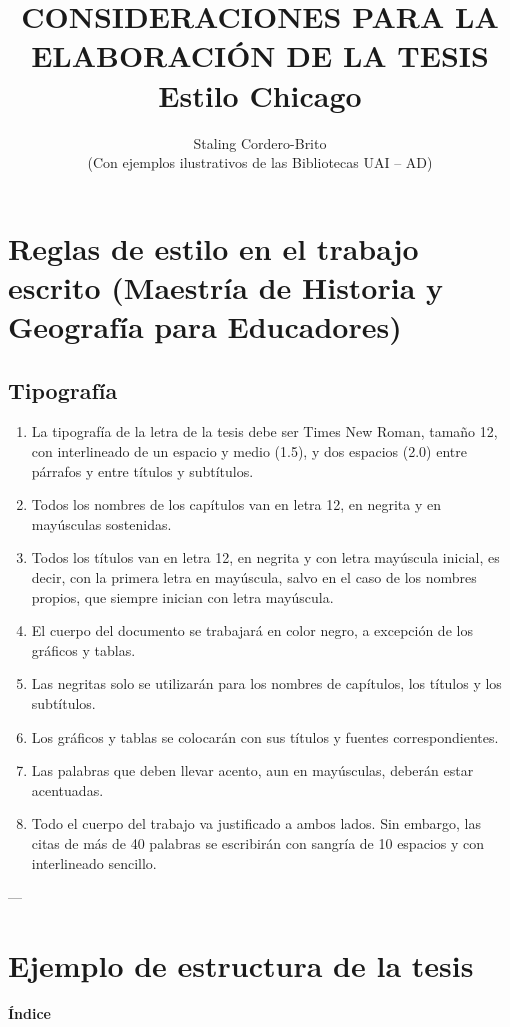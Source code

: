 \documentclass[12pt,a4paper]{article}
\title{CONSIDERACIONES PARA LA ELABORACIÓN DE LA TESIS \\ Estilo Chicago}
\author{Staling Cordero-Brito \\ (Con ejemplos ilustrativos de las Bibliotecas UAI -- AD)}
\date{}
\begin{document}
\maketitle

\section{Reglas de estilo en el trabajo escrito (Maestría de Historia y Geografía para Educadores)}

\subsection*{Tipografía}
\begin{enumerate}[label=\alph*)]
    \item La tipografía de la letra de la tesis debe ser Times New Roman, tamaño 12, con interlineado de un espacio y medio (1.5), y dos espacios (2.0) entre párrafos y entre títulos y subtítulos.
    \item Todos los nombres de los capítulos van en letra 12, en negrita y en mayúsculas sostenidas.
    \item Todos los títulos van en letra 12, en negrita y con letra mayúscula inicial, es decir, con la primera letra en mayúscula, salvo en el caso de los nombres propios, que siempre inician con letra mayúscula.
    \item El cuerpo del documento se trabajará en color negro, a excepción de los gráficos y tablas.
    \item Las negritas solo se utilizarán para los nombres de capítulos, los títulos y los subtítulos.
    \item Los gráficos y tablas se colocarán con sus títulos y fuentes correspondientes.
    \item Las palabras que deben llevar acento, aun en mayúsculas, deberán estar acentuadas.
    \item Todo el cuerpo del trabajo va justificado a ambos lados. Sin embargo, las citas de más de 40 palabras se escribirán con sangría de 10 espacios y con interlineado sencillo.
\end{enumerate}
\newpage
---
\section{Ejemplo de estructura de la tesis}

\begin{center}
\textbf{Índice}
\end{center}
\end{document}
